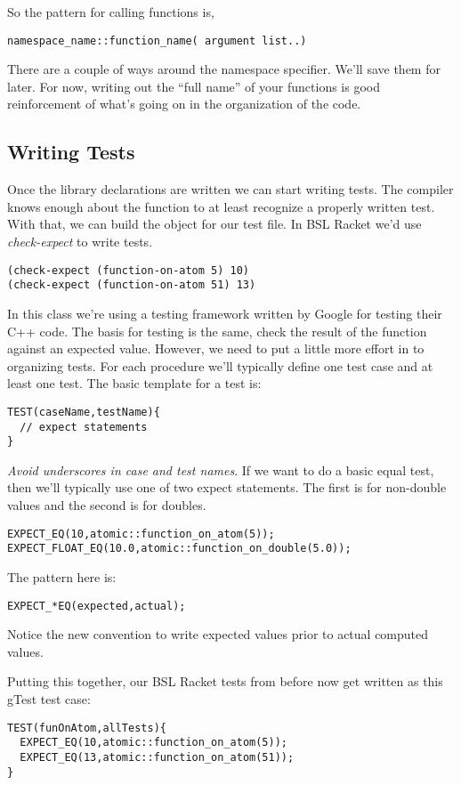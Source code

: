 \documentclass[]{tufte-handout}
\begin{document}
So the pattern for calling functions is,
\begin{verbatim}
namespace_name::function_name( argument list..)
\end{verbatim}
There are a couple of ways around the namespace specifier. We'll save them for later. For now, writing out the ``full name'' of your functions is good reinforcement of what's going on in the organization of the code.

\subsection{Writing Tests}

Once the library declarations are written we can start writing tests.  The compiler knows enough about the function to at least recognize a properly written test. With that, we can build the object for our test file. In BSL Racket we'd use \textit{check-expect} to write tests.
\begin{verbatim}
(check-expect (function-on-atom 5) 10)
(check-expect (function-on-atom 51) 13)
\end{verbatim}

In this class we're using a testing framework written by Google for testing their C++ code. The basis for testing is the same, check the result of the function against an expected value. However, we need to put a little more effort in to organizing tests. For each procedure we'll typically define one test case and at least one test. The basic template for a test is:
\begin{verbatim}
TEST(caseName,testName){
  // expect statements
}
\end{verbatim} 
\textit{Avoid underscores in case and test names}. If we want to do a basic equal test, then we'll typically use one of two expect statements. The first is for non-double values and the second is for doubles.
\begin{verbatim}
EXPECT_EQ(10,atomic::function_on_atom(5));
EXPECT_FLOAT_EQ(10.0,atomic::function_on_double(5.0));
\end{verbatim}
The pattern here is:
\begin{verbatim}
EXPECT_*EQ(expected,actual);
\end{verbatim}
Notice the new convention to write expected values prior to actual computed values.

Putting this together, our BSL Racket tests from before now get written as this gTest test case:
\begin{verbatim}
TEST(funOnAtom,allTests){
  EXPECT_EQ(10,atomic::function_on_atom(5));
  EXPECT_EQ(13,atomic::function_on_atom(51));
}
\end{verbatim}
\end{document}
